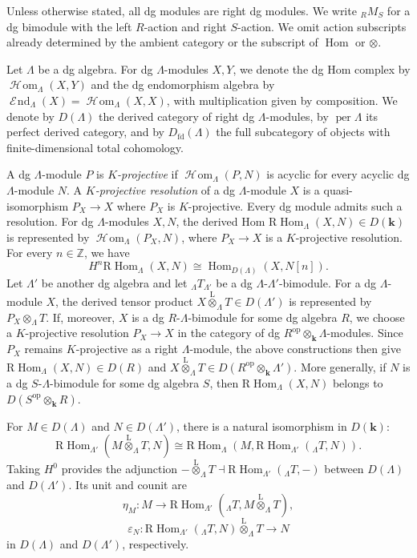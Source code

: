 \documentclass[11pt,a4paper,reqno]{amsart}
\theoremstyle{plain}
\numberwithin{equation}{section}
\theoremstyle{definition}
\providecommand{\per}{\operatorname{per}}
\newcommand{\Hom}{\operatorname{Hom}}
\newcommand{\RHom}{\mathrm R\!\Hom}
\newcommand{\Lotimes}{\overset{\mathrm L}{\otimes}}
\renewcommand{\k}{\mathbf{k}}
\DeclareMathOperator{\huaEnd}{\mathcal{E}\!nd}
\DeclareMathOperator{\huaHom}{\mathcal{H}\!om}
\begin{document}
Unless otherwise stated, all dg modules are right dg modules. We write ${}_RM_S$ for a dg bimodule with the left $R$-action and right $S$-action. We omit action subscripts already determined by the ambient category or the subscript of $\Hom$ or $\otimes$.

Let $\Lambda$ be a dg algebra. For dg $\Lambda$-modules $X,Y$, we denote the dg Hom complex by $\huaHom_\Lambda(X,Y)$ and the dg endomorphism algebra by $\huaEnd_\Lambda(X)=\huaHom_\Lambda(X,X)$, with multiplication given by composition. We denote by $D(\Lambda)$ the derived category of right dg $\Lambda$-modules, by $\per \Lambda$ its perfect derived category, and by $D_{\mathrm{fd}}(\Lambda)$ the full subcategory of objects with finite-dimensional total cohomology.

A dg $\Lambda$-module $P$ is \emph{$K$-projective} if $\huaHom_\Lambda(P,N)$ is acyclic for every acyclic dg $\Lambda$-module $N$. A \emph{$K$-projective resolution} of a dg $\Lambda$-module $X$ is a quasi-isomorphism $P_X\to X$ where $P_X$ is $K$-projective. Every dg module admits such a resolution. For dg $\Lambda$-modules $X,N$, the derived Hom $\RHom_\Lambda(X,N)\in D(\k)$ is represented by $\huaHom_\Lambda(P_X,N)$, where $P_X\to X$ is a $K$-projective resolution. For every $n\in\mathbb Z$, we have
\[
 H^n\RHom_\Lambda(X,N)
 \cong\Hom_{D(\Lambda)}(X,N[n]).
\]
Let $\Lambda'$ be another dg algebra and let ${}_\Lambda T_{\Lambda'}$ be a dg $\Lambda$-$\Lambda'$-bimodule. For a dg $\Lambda$-module $X$, the derived tensor product $X\Lotimes_\Lambda T\in D(\Lambda')$ is represented by $P_X\otimes_\Lambda T$. If, moreover, $X$ is a dg $R$-$\Lambda$-bimodule for some dg algebra $R$, we choose a $K$-projective resolution $P_X\to X$ in the category of dg $R^{\mathrm{op}}\otimes_{\k}\Lambda$-modules. Since $P_X$ remains $K$-projective as a right $\Lambda$-module, the above constructions then give $\RHom_\Lambda(X,N)\in D(R)$ and $X\Lotimes_\Lambda T\in D(R^{\mathrm{op}}\otimes_{\k}\Lambda')$. More generally, if $N$ is a dg $S$-$\Lambda$-bimodule for some dg algebra $S$, then $\RHom_\Lambda(X,N)$ belongs to $D(S^{\mathrm{op}}\otimes_{\k}R)$.

For $M\in D(\Lambda)$ and $N\in D(\Lambda')$, there is a natural isomorphism in $D(\k)$:
\begin{equation}\label{eq:tensor-Hom}
 \RHom_{\Lambda'}
   \left(M\overset{\mathrm L}{\otimes}_{\Lambda}T,N\right)
 \cong
 \RHom_{\Lambda}
   \left(M,\RHom_{\Lambda'}({}_\Lambda T,N)\right).
\end{equation}
Taking $H^0$ provides the adjunction $-\overset{\mathrm L}{\otimes}_\Lambda T\dashv\mathrm R\!\Hom_{\Lambda'}({}_\Lambda T,-)$ between $D(\Lambda)$ and $D(\Lambda')$. Its unit and counit are
\begin{equation}\label{eq:unit}
    \eta_M\colon M\rightarrow\RHom_{\Lambda'}\left({}_\Lambda T,M\overset{\mathrm L}{\otimes}_\Lambda T\right),
\end{equation}
\begin{equation}\label{eq:counit}
    \varepsilon_N\colon \RHom_{\Lambda'}({}_\Lambda T,N)\overset{\mathrm L}{\otimes}_\Lambda T\rightarrow N
\end{equation}
in $D(\Lambda)$ and $D(\Lambda')$, respectively.
\end{document}
